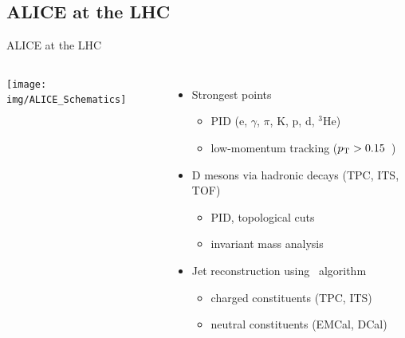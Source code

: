 \documentclass[xcolor={usenames,dvipsnames}]{beamer}
\begin{document}
\subsection{ALICE at the LHC}
\begin{frame}{ALICE at the LHC}
\begin{columns}

\texttt{[image: img/ALICE\_Schematics]}

\begin{itemize}
\item Strongest points
\begin{itemize}
\item \alert{PID} (e, $\gamma$, $\pi$, K, p, d, ${}^3$He)
\item \alert{low-momentum tracking} ($p_{\rm T} > 0.15$~\GeVc)
\end{itemize}
\item \alert{D mesons} via hadronic decays (TPC, ITS, TOF)
\begin{itemize}
\item PID, topological cuts
\item invariant mass analysis
\end{itemize}
\item \alert{Jet reconstruction} using \antikt\ algorithm
\begin{itemize}
\item charged constituents (TPC, ITS)
\item neutral constituents (EMCal, DCal)
\end{itemize}
\end{itemize}
\end{columns}
\end{frame}
\end{document}
